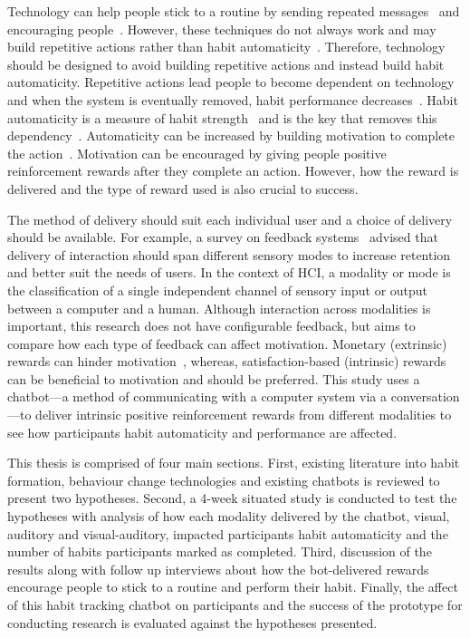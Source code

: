 Technology can help people stick to a routine by sending repeated messages~\cite{chi_crowd_designed_motivation} and encouraging people~\cite{positive_reinforcement_pro}. However, these techniques do not always work and may build repetitive actions rather than habit automaticity~\cite{coaching_not_that_good}. Therefore, technology should be designed to avoid building repetitive actions and instead build habit automaticity. Repetitive actions lead people to become dependent on technology and when the system is eventually removed, habit performance decreases~\cite{article_dont_kick_habit, article_realtime_feedback_improving_medication_taking}. Habit automaticity is a measure of habit strength~\cite{article_4q_SRBAI} and is the key that removes this dependency~\cite{article_beyond_self_tracking_designing_apps}. Automaticity can be increased by building motivation to complete the action~\cite{article_a_self_efficacy, article_meta_analytic_review_intrinsic_motivation}.
Motivation can be encouraged by giving people positive reinforcement rewards after they complete an action. However, how the reward is delivered and the type of reward used is also crucial to success.

The method of delivery should suit each individual user and a choice of delivery should be available. For example, a survey on feedback systems~\cite{article_user_centred_multimodal_reminders} advised that delivery of interaction should span different sensory modes to increase retention and better suit the needs of users. In the context of HCI, a modality or mode is the classification of a single independent channel of sensory input or output between a computer and a human. Although interaction across modalities is important, this research does not have configurable feedback, but aims to compare how each type of feedback can affect motivation. Monetary (extrinsic) rewards can hinder motivation~\cite{article_meta_analytic_review_intrinsic_motivation}, whereas, satisfaction-based (intrinsic) rewards can be beneficial to motivation and should be preferred.
This study uses a chatbot---a method of communicating with a computer system via a conversation---to deliver intrinsic positive reinforcement rewards from different modalities to see how participants habit automaticity and performance are affected.

This thesis is comprised of four main sections. First, existing literature into habit formation, behaviour change technologies and existing chatbots is reviewed to present two hypotheses. Second, a 4-week situated study is conducted to test the hypotheses with analysis of how each modality delivered by the chatbot, visual, auditory and visual-auditory, impacted participants habit automaticity and the number of habits participants marked as completed. Third, discussion of the results along with follow up interviews about how the bot-delivered rewards encourage people to stick to a routine and perform their habit. Finally, the affect of this habit tracking chatbot on participants and the success of the prototype for conducting research is evaluated against the hypotheses presented.

